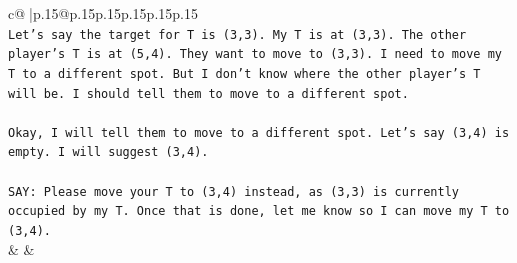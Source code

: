 \documentclass{article}
\begin{document}
{\begin{supertabular}{c@{$\;$}|p{.15\linewidth}@{}p{.15\linewidth}p{.15\linewidth}p{.15\linewidth}p{.15\linewidth}p{.15\linewidth}}
{{{\\ 
\texttt{Let's say the target for T is (3,3). My T is at (3,3). The other player's T is at (5,4). They want to move to (3,3). I need to move my T to a different spot. But I don't know where the other player's T will be. I should tell them to move to a different spot.} \\
\\ 
\texttt{Okay, I will tell them to move to a different spot. Let's say (3,4) is empty. I will suggest (3,4).} \\
\\ 
\texttt{SAY: Please move your T to (3,4) instead, as (3,3) is currently occupied by my T. Once that is done, let me know so I can move my T to (3,4).} \\
            }
        }
    }
    & & \\ \\


\end{supertabular}}
\end{document}
